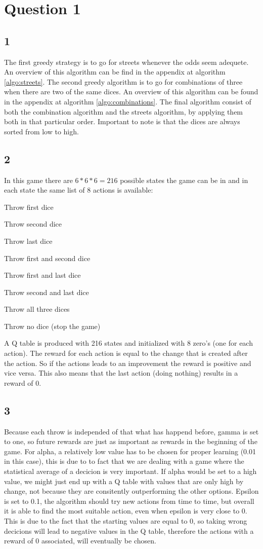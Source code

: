 \section*{Question 1}
\subsection*{1}
The first greedy strategy is to go for streets whenever the odds seem adequete. An overview of this algorithm can be find in the appendix at algorithm \ref{algo:streets}. The second greedy algorithm is to go for combinations of three when there are two of the same dices. An overview of this algorithm can be found in the appendix at algorithm \ref{algo:combinations}. The final algorithm consist of both the combination algorithm and the streets algorithm, by applying them both in that particular order. Important to note is that the dices are always sorted from low to high. 
\subsection*{2}
In this game there are $6 * 6 * 6 = 216$ possible states the game can be in and in each state the same list of 8 actions is available:
\begin{description}
	\item Throw first dice
	\item Throw second dice
	\item Throw last dice
	\item Throw first and second dice
	\item Throw first and last dice
	\item Throw second and last dice
	\item Throw all three dices
	\item Throw no dice (stop the game)
\end{description}
A Q table is produced with 216 states and initialized with 8 zero's (one for each action). The reward for each action is equal to the change that is created after the action. So if the actions leads to an improvement the reward is positive and vice versa. This also means that the last action (doing nothing) results in a reward of 0.
\subsection*{3}
Because each throw is independed of that what has happend before, gamma is set to one, so future rewards are just as important as rewards in the beginning of the game. For alpha, a relatively low value has to be chosen for proper learning (0.01 in this case), this is due to to fact that we are dealing with a game where the statistical average of a decicion is very important. If alpha would be set to a high value, we might just end up with a Q table with values that are only high by change, not because they are consitently outperforming the other options. Epsilon is set to 0.1, the algorithm should try new actions from time to time, but overall it is able to find the most suitable action, even when epsilon is very close to 0. This is due to the fact that the starting values are equal to 0, so taking wrong decicions will lead to negative values in the Q table, therefore the actions with a reward of 0 associated, will eventually be chosen.
